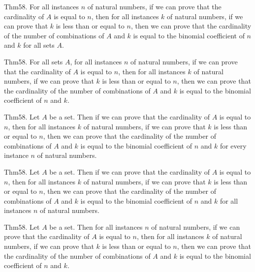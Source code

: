 \documentclass{article}
\begin{document}
Thm58. For all instances $n$ of natural numbers, if we can prove that the cardinality of $A$ is equal to $n$, then for all instances $k$ of natural numbers, if we can prove that $k$ is less than or equal to $n$, then we can prove that the cardinality of the number of combinations of $A$ and $k$ is equal to the binomial coefficient of $n$ and $k$ for all sets $A$.

Thm58. For all sets $A$, for all instances $n$ of natural numbers, if we can prove that the cardinality of $A$ is equal to $n$, then for all instances $k$ of natural numbers, if we can prove that $k$ is less than or equal to $n$, then we can prove that the cardinality of the number of combinations of $A$ and $k$ is equal to the binomial coefficient of $n$ and $k$.

Thm58. Let $A$ be a set. Then if we can prove that the cardinality of $A$ is equal to $n$, then for all instances $k$ of natural numbers, if we can prove that $k$ is less than or equal to $n$, then we can prove that the cardinality of the number of combinations of $A$ and $k$ is equal to the binomial coefficient of $n$ and $k$ for every instance $n$ of natural numbers.

Thm58. Let $A$ be a set. Then if we can prove that the cardinality of $A$ is equal to $n$, then for all instances $k$ of natural numbers, if we can prove that $k$ is less than or equal to $n$, then we can prove that the cardinality of the number of combinations of $A$ and $k$ is equal to the binomial coefficient of $n$ and $k$ for all instances $n$ of natural numbers.

Thm58. Let $A$ be a set. Then for all instances $n$ of natural numbers, if we can prove that the cardinality of $A$ is equal to $n$, then for all instances $k$ of natural numbers, if we can prove that $k$ is less than or equal to $n$, then we can prove that the cardinality of the number of combinations of $A$ and $k$ is equal to the binomial coefficient of $n$ and $k$.
\end{document}
